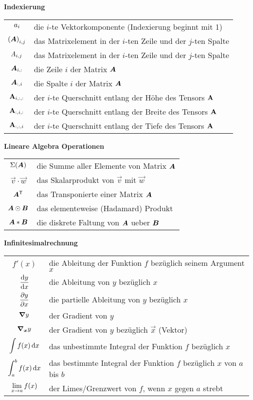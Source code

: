 \begin{center}\textbf{Indexierung}\end{center}
\begin{tabular}{cl}
  $a_i$ & die $i$-te Vektorkomponente (Indexierung beginnt mit 1) \\
  ${(\bm{A})}_{i,j}$ & das Matrixelement in der $i$-ten Zeile und der $j$-ten Spalte \\
  $\mathit{A}_{i,j}$ & das Matrixelement in der $i$-ten Zeile und der $j$-ten Spalte \\
  $\bm{A}_{i,:}$ & die Zeile $i$ der Matrix $\bm{A}$ \\
  $\bm{A}_{:,i}$ & die Spalte $i$ der Matrix $\bm{A}$\ \\
  $\mathbf{A}_{i,:,:}$ & der $i$-te Querschnitt entlang der Höhe des Tensors $\mathbf{A}$ \\
  $\mathbf{A}_{:,i,:}$ & der $i$-te Querschnitt entlang der Breite des Tensors $\mathbf{A}$ \\
  $\mathbf{A}_{:,:,i}$ & der $i$-te Querschnitt entlang der Tiefe des Tensors $\mathbf{A}$ \\
\end{tabular}

\begin{center}\textbf{Lineare Algebra Operationen}\end{center}
\begin{tabular}{cl}
  $\Sigma(\bm{A})$ & die Summe aller Elemente von Matrix $\bm{A}$ \\
  $\vec{v} \cdot \vec{w}$ & das Skalarprodukt von $\vec{v}$ mit $\vec{w}$ \\
  $\bm{A}^{\mathsf{T}}$ & das Transponierte einer Matrix $\bm{A}$ \\
  $\bm{A} \odot \bm{B}$ & das elementeweise (Hadamard) Produkt \\
  $\bm{A} * \bm{B}$ & die diskrete Faltung von $\bm{A}$ ueber $\bm{B}$

\end{tabular}

\begin{center}\textbf{Infinitesimalrechnung}\end{center}
\begin{tabular}{cl}
  $f'(x)$ & die Ableitung der Funktion $f$ bezüglich seinem Argument $x$ \\
  $\displaystyle\frac{\text{d}y}{\text{d}x}$ & die Ableitung von $y$ bezüglich $x$ \\[2ex]
  $\displaystyle\frac{\partial y}{\partial x}$ & die partielle Ableitung von $y$ bezüglich $x$ \\[2ex]
  $\bm{\nabla} y$ & der Gradient von $y$\\
  $\bm{\nabla}_{\bm{x}}y$ & der Gradient von $y$ bezüglich $\vec{x}$ (Vektor) \\
  $\displaystyle\int f(x)\,\text{d}x$ & das unbestimmte Integral der Funktion $f$ bezüglich $x$ \\
  $\displaystyle\int_a^b f(x)\,\text{d}x$ & das bestimmte Integral der Funktion $f$ bezüglich $x$ von $a$ bis $b$ \\
  $\displaystyle\lim_{x \to a} f(x)$ & der Limes/Grenzwert von $f$, wenn $x$ gegen $a$ strebt \\

\end{tabular}

